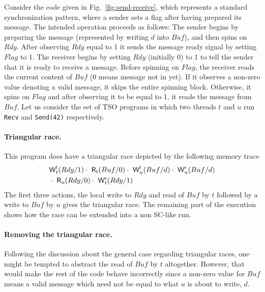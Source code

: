 \documentclass[preprint,9pt]{sigplanconf}
\begin{document}
Consider the code given in Fig.~\ref{fig:send-receive}, which represents a standard synchronization pattern, where a sender sets a flag after having prepared its message.
The intended operation proceeds as follows:
The sender begins by preparing the message (represented by writing $d$ into $Buf$), and then spins on $Rdy$.
After observing $Rdy$ equal to 1 it sends the message ready signal by setting $Flag$ to 1.
The receiver begins by setting $Rdy$ (initially 0) to 1 to tell the sender that it is ready to receive a message.
Before spinning on $Flag$, the receiver reads the current content of $Buf$ (0 means message not in yet).
If it observes a non-zero value denoting a valid message, it skips the entire spinning block.
Otherwise, it spins on $Flag$ and after observing it to be equal to 1, it reads the message from $Buf$.
Let us consider the set of TSO programs in which two threads $t$ and $u$ run {\tt Recv} and {\tt Send(42)} respectively.

\paragraph{Triangular race.}
This program does have a triangular race depicted by the following memory trace
\begin{eqnarray*}
& \mathsf{W}^{\mathsf{l}}_{t}(Rdy/1) \cdot\ \mathsf{R}_{t}(Buf/0)\cdot\ \mathsf{W}^{\mathsf{l}}_{u}(Buf/d) \cdot\ \mathsf{W}^{\mathsf{r}}_{u}(Buf/d)\\
&\cdot\ \mathsf{R}_{u}(Rdy/0)\cdot\ \mathsf{W}^{\mathsf{r}}_{t}(Rdy/1)
\end{eqnarray*}
The first three actions, the local write to $Rdy$ and read of $Buf$ by $t$ followed by a write to $Buf$ by $u$ gives the triangular race.
The remaining part of the execution shows how the race can be extended into a non SC-like run. 

\paragraph{Removing the triangular race.}
Following the discussion about the general case regarding triangular races, one might be tempted to abstract the read of $Buf$ by $t$ altogether.
However, that would make the rest of the code behave incorrectly since a non-zero value for $Buf$ means a valid message which need not be equal to what $u$ is about to write, $d$.
\end{document}
